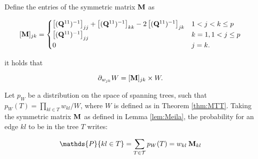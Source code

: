 \begin{lemma}  \label{lem:Meila}
    Define the entries of the symmetric matrix ${\bf M}$ as
 
\[    
 [{\bf M}]_{jk} =\begin{cases}
    \left[({\bf Q}^{11})^{-1}\right]_{jj} + \left[({\bf Q}^{11})^{-1}\right]_{kk} -2\left[({\bf Q}^{11})^{-1}\right]_{jk} & 1< j<k \leq p\\
    \left[({\bf Q}^{11})^{-1}\right]_{jj} & k=1, 1< j \leq p  \\
    0 &  j=k .
    \end{cases}
\]
 
it holds that
 
$$
\partial_{w_{jk}} W = [{\bf M}]_{jk}  \times W.
$$
\end{lemma}
\begin{lemma}  \label{lem:Kirshner}
    Let $p_W$ be a distribution on the space of spanning trees, such that $p_W(T)=\prod_{kl\in T} w_{kl} / W$, where $W$ is defined as in Theorem \ref{thm:MTT}. Taking the symmetric matrix ${\bf M}$ as defined in Lemma  \ref{lem:Meila}, the probability for an edge $kl$ to be in the tree $T$ writes:
 
$$\mathds{P}\{kl\in T\} = \sum_{T\in \mathcal{T}} p_W(T)= w_{kl}\: \Mbf_{kl}$$
\end{lemma}
